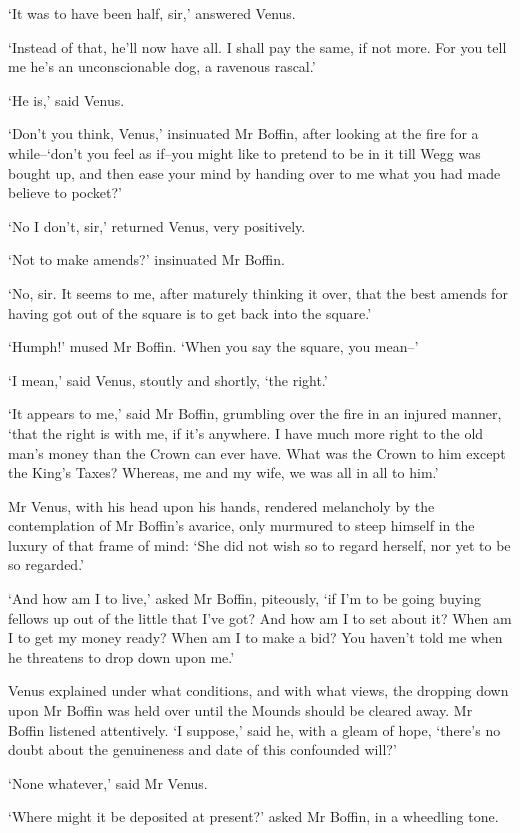 ‘It was to have been half, sir,’ answered Venus.

‘Instead of that, he’ll now have all. I shall pay the same, if not more.
For you tell me he’s an unconscionable dog, a ravenous rascal.’

‘He is,’ said Venus.

‘Don’t you think, Venus,’ insinuated Mr Boffin, after looking at the
fire for a while--‘don’t you feel as if--you might like to pretend to be
in it till Wegg was bought up, and then ease your mind by handing over
to me what you had made believe to pocket?’

‘No I don’t, sir,’ returned Venus, very positively.

‘Not to make amends?’ insinuated Mr Boffin.

‘No, sir. It seems to me, after maturely thinking it over, that the best
amends for having got out of the square is to get back into the square.’

‘Humph!’ mused Mr Boffin. ‘When you say the square, you mean--’

‘I mean,’ said Venus, stoutly and shortly, ‘the right.’

‘It appears to me,’ said Mr Boffin, grumbling over the fire in an
injured manner, ‘that the right is with me, if it’s anywhere. I have
much more right to the old man’s money than the Crown can ever have.
What was the Crown to him except the King’s Taxes? Whereas, me and my
wife, we was all in all to him.’

Mr Venus, with his head upon his hands, rendered melancholy by the
contemplation of Mr Boffin’s avarice, only murmured to steep himself
in the luxury of that frame of mind: ‘She did not wish so to regard
herself, nor yet to be so regarded.’

‘And how am I to live,’ asked Mr Boffin, piteously, ‘if I’m to be going
buying fellows up out of the little that I’ve got? And how am I to set
about it? When am I to get my money ready? When am I to make a bid? You
haven’t told me when he threatens to drop down upon me.’

Venus explained under what conditions, and with what views, the dropping
down upon Mr Boffin was held over until the Mounds should be cleared
away. Mr Boffin listened attentively. ‘I suppose,’ said he, with a
gleam of hope, ‘there’s no doubt about the genuineness and date of this
confounded will?’

‘None whatever,’ said Mr Venus.

‘Where might it be deposited at present?’ asked Mr Boffin, in a
wheedling tone.

